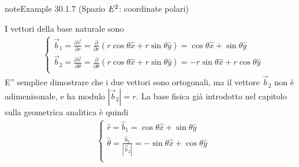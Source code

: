 \documentclass[letterpaper,10pt,italian]{jupyterBook}
\begin{document}
\begin{sphinxadmonition}{note}{Example 30.1.7 (Spazio \protect\(E^2\protect\): coordinate polari)}



\sphinxAtStartPar
I vettori della base naturale sono
\begin{equation*}
\begin{split}\begin{cases}
  \vec{b}_1 = \frac{\partial \vec{r}}{\partial r     } = \frac{\partial }{\partial r     } \left( r \cos \theta \hat{x} + r \sin \theta \hat{y} \right) = \cos \theta \hat{x} + \sin \theta \hat{y} \\
  \vec{b}_2 = \frac{\partial \vec{r}}{\partial \theta} = \frac{\partial }{\partial \theta} \left( r \cos \theta \hat{x} + r \sin \theta \hat{y} \right) = -r\sin \theta \hat{x} + r \cos \theta\hat{y} \\
\end{cases}\end{split}
\end{equation*}
\sphinxAtStartPar
E” semplice dimostrare che i due vettori sono ortogonali, ma il vettore \(\vec{b}_2\) non è adimenisonale, e ha modulo \(|\vec{b}_2| = r\). La base fisica \sphinxhyphen{} già introdotto nel capitolo sulla geometrica analitica   \sphinxhyphen{} è quindi
\begin{equation*}
\begin{split}\begin{cases}
  \hat{r}      = \hat{b}_1 = \cos \theta \hat{x} + \sin \theta \hat{y} \\
  \hat{\theta} = \frac{\hat{b}_2}{|\vec{b}_2|} = - \sin \theta \hat{x} + \cos \theta \hat{y} \\
\end{cases}\end{split}
\end{equation*}\end{sphinxadmonition}
\label{ch/vector-calculus/geometry:def-cartesian-coords-e3-base}
\end{document}

